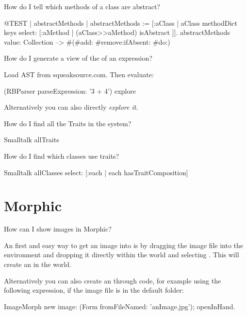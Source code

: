\documentclass[a4paper,10pt,twoside]{book}
\begin{document}
\begin{faq}
How do I tell which methods of a class are abstract?
\end{faq}
\answer
\begin{code}{@TEST | abstractMethods |}
abstractMethods :=
	[:aClass | aClass methodDict keys select:
		[:aMethod | (aClass>>aMethod) isAbstract ]].
abstractMethods value: Collection --> #(#add: #remove:ifAbsent: #do:)
\end{code}

\begin{faq}
How do I generate a view of the  of an expression?
\end{faq}
\answer
Load AST from squeaksource.com. Then evaluate:
\begin{code}{}
(RBParser parseExpression: '3 + 4') explore
\end{code}
Alternatively you can also directly \emph{explore it}.

\begin{faq}
How do I find all the Traits in the system?
\end{faq}
\answer
\begin{code}{}
Smalltalk allTraits
\end{code}

\begin{faq}
How do I find which classes use traits?
\end{faq}
\answer
\begin{code}{}
Smalltalk allClasses select: [:each | each hasTraitComposition]
\end{code}

\section{Morphic}
\begin{faq}
How can I show images in Morphic?
\end{faq}
\answer
An first and easy way to get an image into \sq is by dragging the image file into the environment and dropping it directly within the world and selecting .
This will create an  in the world.

\noindent Alternatively you can also create an  through code, for example using the following expression, if the image file is in the default folder:
\begin{code}{}
ImageMorph new
    image: (Form fromFileNamed: 'anImage.jpg');
    openInHand.
\end{code}  
\end{document}

